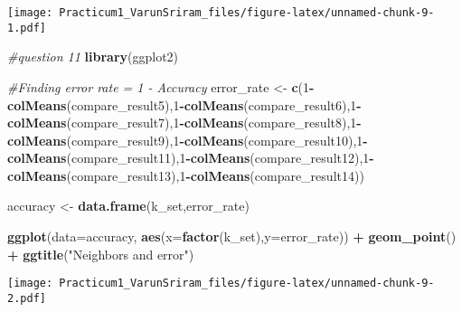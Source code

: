 \documentclass[]{article}
\newenvironment{Shaded}{\begin{snugshade}}{\end{snugshade}}
\newcommand{\KeywordTok}[1]{\textcolor[rgb]{0.13,0.29,0.53}{\textbf{#1}}}
\newcommand{\DataTypeTok}[1]{\textcolor[rgb]{0.13,0.29,0.53}{#1}}
\newcommand{\DecValTok}[1]{\textcolor[rgb]{0.00,0.00,0.81}{#1}}
\newcommand{\StringTok}[1]{\textcolor[rgb]{0.31,0.60,0.02}{#1}}
\newcommand{\CommentTok}[1]{\textcolor[rgb]{0.56,0.35,0.01}{\textit{#1}}}
\newcommand{\OperatorTok}[1]{\textcolor[rgb]{0.81,0.36,0.00}{\textbf{#1}}}
\newcommand{\NormalTok}[1]{#1}
\begin{document}
\texttt{[image: Practicum1\_VarunSriram\_files/figure-latex/unnamed-chunk-9-1.pdf]}

\begin{Shaded}
\begin{Highlighting}[]
\CommentTok{#question 11}
\KeywordTok{library}\NormalTok{(ggplot2)}

\CommentTok{#Finding error rate = 1 - Accuracy}
\NormalTok{error_rate <-}\StringTok{ }\KeywordTok{c}\NormalTok{(}\DecValTok{1}\OperatorTok{-}\KeywordTok{colMeans}\NormalTok{(compare_result5),}\DecValTok{1}\OperatorTok{-}\KeywordTok{colMeans}\NormalTok{(compare_result6),}\DecValTok{1}\OperatorTok{-}\KeywordTok{colMeans}\NormalTok{(compare_result7),}\DecValTok{1}\OperatorTok{-}\KeywordTok{colMeans}\NormalTok{(compare_result8),}\DecValTok{1}\OperatorTok{-}\KeywordTok{colMeans}\NormalTok{(compare_result9),}\DecValTok{1}\OperatorTok{-}\KeywordTok{colMeans}\NormalTok{(compare_result10),}\DecValTok{1}\OperatorTok{-}\KeywordTok{colMeans}\NormalTok{(compare_result11),}\DecValTok{1}\OperatorTok{-}\KeywordTok{colMeans}\NormalTok{(compare_result12),}\DecValTok{1}\OperatorTok{-}\KeywordTok{colMeans}\NormalTok{(compare_result13),}\DecValTok{1}\OperatorTok{-}\KeywordTok{colMeans}\NormalTok{(compare_result14))}

\NormalTok{accuracy <-}\StringTok{ }\KeywordTok{data.frame}\NormalTok{(k_set,error_rate)}

\KeywordTok{ggplot}\NormalTok{(}\DataTypeTok{data=}\NormalTok{accuracy, }\KeywordTok{aes}\NormalTok{(}\DataTypeTok{x=}\KeywordTok{factor}\NormalTok{(k_set),}\DataTypeTok{y=}\NormalTok{error_rate)) }\OperatorTok{+}\StringTok{ }\KeywordTok{geom_point}\NormalTok{() }\OperatorTok{+}\StringTok{ }\KeywordTok{ggtitle}\NormalTok{(}\StringTok{"Neighbors and error"}\NormalTok{)}
\end{Highlighting}
\end{Shaded}

\texttt{[image: Practicum1\_VarunSriram\_files/figure-latex/unnamed-chunk-9-2.pdf]}

\begin{Shaded}
\end{Shaded}
\end{document}
